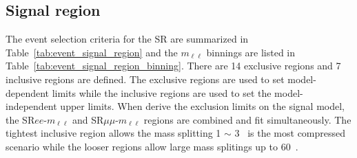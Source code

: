 
\subsection{Signal region}
\label{subsec:event_signal_region}
The event selection criteria for the SR are summarized in Table~\ref{tab:event_signal_region} and the $m_{\ell\ell}$ binnings are listed in Table~\ref{tab:event_signal_region_binning}.
There are 14 exclusive regions and 7 inclusive regions are defined.
The exclusive regions are used to set model-dependent limits while the inclusive regions are used to set the model-independent upper limits.
When derive the exclusion limits on the signal model, the SR$ee$-$m_{\ell\ell}$ and SR$\mu\mu$-$m_{\ell\ell}$ regions are combined and fit simultaneously.
The tightest inclusive region allows the mass splitting 1 $\sim$ 3~{\GeV} is the most compressed scenario while the looser regions allow large mass splitings up to 60~{\GeV}.

